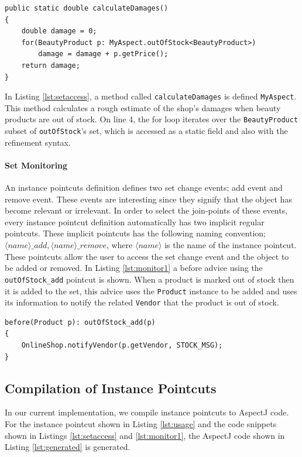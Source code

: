 \documentclass{llncs}
\begin{document}
\begin{lstlisting}[float=h!, caption={Calculate a damage estimate for out of stock beauty products}, label={lst:setaccess}]
public static double calculateDamages()
{
	double damage = 0;
	for(BeautyProduct p: MyAspect.outOfStock<BeautyProduct>)
		damage = damage + p.getPrice();
	return damage;
}
\end{lstlisting}

In Listing \ref{lst:setaccess},  a method called \texttt{calculateDamages} is defined \texttt{MyAspect}. This method calculates a rough estimate of the shop's damages when beauty products are out of stock. On line 4, the for loop iterates over the \texttt{BeautyProduct} subset of \texttt{outOfStock}'s set, which is accessed as a static field and also with the refinement syntax.


\paragraph{Set Monitoring}
An instance pointcuts definition defines two set change events; add event and remove event. These events are interesting since they signify that the object has become relevant or irrelevant. In order to select the join-points of these events, every instance pointcut definition automatically has two implicit regular pointcuts. These implicit pointcuts has the following naming convention; $\langle name \rangle\_add, \langle name \rangle\_remove$, where $\langle name \rangle$ is the name of the instance pointcut. These pointcuts allow the user to access the set change event and the object to be added or removed. In Listing \ref{lst:monitor1} a before advice using the \texttt{outOfStock_add} pointcut is shown. When a product is marked out of stock then it is added to the set, this advice uses the \texttt{Product} instance to be added and uses its information to notify the related \texttt{Vendor} that the product is out of stock.

\begin{lstlisting}[float=h!, caption={Set monitoring pointcut used to notify vendors}, label={lst:monitor1}]
before(Product p): outOfStock_add(p)
{
	OnlineShop.notifyVendor(p.getVendor, STOCK_MSG);
}
\end{lstlisting}

\subsection{Compilation of Instance Pointcuts}
In our current implementation, we compile instance pointcuts to AspectJ code. For the instance pointcut shown in Listing \ref{lst:usage} and the code snippets shown in Listings \ref{lst:setaccess} and \ref{lst:monitor1}, the AspectJ code shown in Listing \ref{lst:generated} is generated. 
\end{document}
